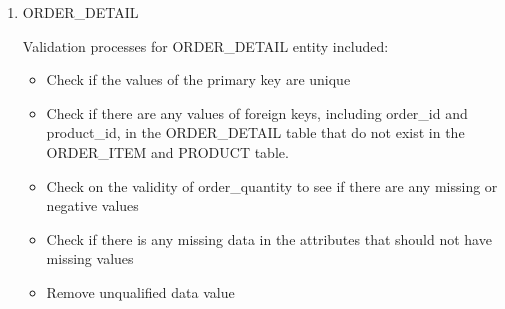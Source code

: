 \documentclass[
  letterpaper,
  DIV=11,
  numbers=noendperiod]{scrartcl}
\newenvironment{Shaded}{\begin{snugshade}}{\end{snugshade}}
\newcommand{\CommentTok}[1]{\textcolor[rgb]{0.37,0.37,0.37}{#1}}
\newcommand{\FunctionTok}[1]{\textcolor[rgb]{0.28,0.35,0.67}{#1}}
\newcommand{\NormalTok}[1]{\textcolor[rgb]{0.00,0.23,0.31}{#1}}
\newcommand{\OtherTok}[1]{\textcolor[rgb]{0.00,0.23,0.31}{#1}}
\newcommand{\SpecialCharTok}[1]{\textcolor[rgb]{0.37,0.37,0.37}{#1}}
\begin{document}
\begin{enumerate}
\begin{Shaded}
\end{Shaded}
\item
  ORDER\_DETAIL

  Validation processes for ORDER\_DETAIL entity included:

  \begin{itemize}
  \item
    Check if the values of the primary key are unique
  \item
    Check if there are any values of foreign keys, including order\_id
    and product\_id, in the ORDER\_DETAIL table that do not exist in the
    ORDER\_ITEM and PRODUCT table.
  \item
    Check on the validity of order\_quantity to see if there are any
    missing or negative values
  \item
    Check if there is any missing data in the attributes that should not
    have missing values
  \item
    Remove unqualified data value
  \end{itemize}


\end{enumerate}
\end{document}

